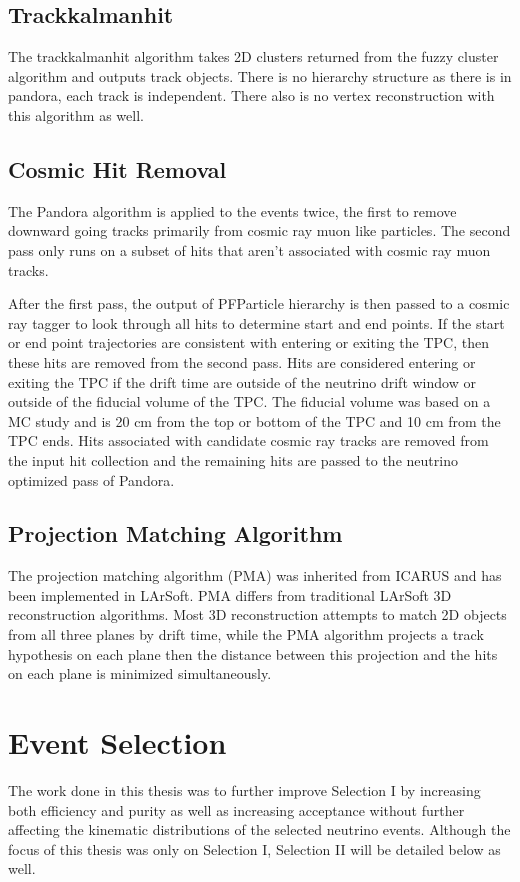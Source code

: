 \subsection{Trackkalmanhit}
The trackkalmanhit algorithm takes 2D clusters returned from the fuzzy cluster algorithm and outputs track objects. There is no hierarchy structure as there is in pandora, each track is independent. There also is no vertex reconstruction with this algorithm as well.
\subsection{Cosmic Hit Removal}
The Pandora algorithm is applied to the events twice, the first to remove downward going tracks primarily from cosmic ray muon like particles. The second pass only runs on a subset of hits that aren't associated with cosmic ray muon tracks. 

After the first pass, the output of PFParticle hierarchy is then passed to a cosmic ray tagger to look through all hits to determine start and end points. If the start or end point trajectories are consistent with entering or exiting the TPC, then these hits are removed from the second pass. Hits are considered entering or exiting the TPC if the drift time are outside of the neutrino drift window or outside of the fiducial volume of the TPC. The fiducial volume was based on a MC study and is 20 cm from the top or bottom of the TPC and 10 cm from the TPC ends. Hits associated with candidate cosmic  ray tracks are removed from the input hit collection and the remaining hits are passed to the neutrino optimized pass of Pandora.


\subsection{Projection Matching Algorithm}
The projection matching algorithm (PMA) was inherited from ICARUS and has been implemented in LArSoft. PMA differs from traditional LArSoft 3D reconstruction algorithms. Most 3D reconstruction attempts to match 2D objects from all three planes by drift time, while the PMA algorithm projects a track hypothesis on each plane then the distance between this projection and the hits on each plane is minimized simultaneously.
\section{Event Selection}\label{section:eventselection}
The work done in this thesis was to further improve Selection I by increasing both efficiency and purity as well as increasing acceptance without further affecting the kinematic distributions of the selected neutrino events. Although the focus of this thesis was only on Selection I, Selection II will be detailed below as well.

